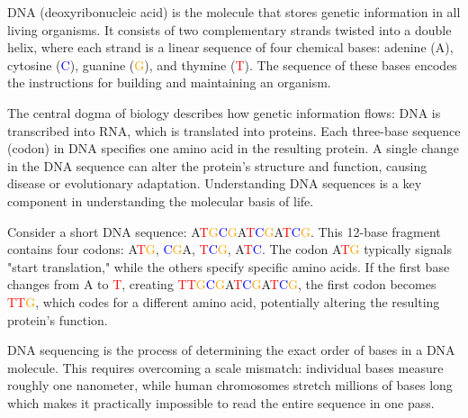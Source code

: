 DNA (deoxyribonucleic acid) is the molecule that stores genetic information in all living organisms. It consists of two complementary strands twisted into a double helix, where each strand is a linear sequence of four chemical bases: adenine (\textcolor{green!60!black}{A}), cytosine (\textcolor{blue}{C}), guanine (\textcolor{orange}{G}), and thymine (\textcolor{red}{T}). The sequence of these bases encodes the instructions for building and maintaining an organism.

The central dogma of biology describes how genetic information flows: DNA is transcribed into RNA, which is translated into proteins. Each three-base sequence (codon) in DNA specifies one amino acid in the resulting protein. A single change in the DNA sequence can alter the protein's structure and function, causing disease or evolutionary adaptation. Understanding DNA sequences is a key component in understanding the molecular basis of life.

Consider a short DNA sequence: \textcolor{green!60!black}{A}\textcolor{red}{T}\textcolor{orange}{G}\textcolor{blue}{C}\textcolor{orange}{G}\textcolor{green!60!black}{A}\textcolor{red}{T}\textcolor{blue}{C}\textcolor{orange}{G}\textcolor{green!60!black}{A}\textcolor{red}{T}\textcolor{blue}{C}\textcolor{orange}{G}. This 12-base fragment contains four codons: \textcolor{green!60!black}{A}\textcolor{red}{T}\textcolor{orange}{G}, \textcolor{blue}{C}\textcolor{orange}{G}\textcolor{green!60!black}{A}, \textcolor{red}{T}\textcolor{blue}{C}\textcolor{orange}{G}, \textcolor{green!60!black}{A}\textcolor{red}{T}\textcolor{blue}{C}. The codon \textcolor{green!60!black}{A}\textcolor{red}{T}\textcolor{orange}{G} typically signals "start translation," while the others specify specific amino acids. If the first base changes from \textcolor{green!60!black}{A} to \textcolor{red}{T}, creating \textcolor{red}{T}\textcolor{red}{T}\textcolor{orange}{G}\textcolor{blue}{C}\textcolor{orange}{G}\textcolor{green!60!black}{A}\textcolor{red}{T}\textcolor{blue}{C}\textcolor{orange}{G}\textcolor{green!60!black}{A}\textcolor{red}{T}\textcolor{blue}{C}\textcolor{orange}{G}, the first codon becomes \textcolor{red}{T}\textcolor{red}{T}\textcolor{orange}{G}, which codes for a different amino acid, potentially altering the resulting protein's function.

DNA sequencing is the process of determining the exact order of bases in a DNA molecule. This requires overcoming a scale mismatch: individual bases measure roughly one nanometer, while human chromosomes stretch millions of bases long which makes it practically impossible to read the entire sequence in one pass.

